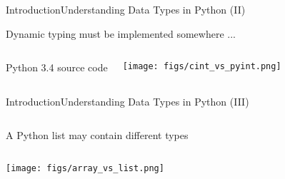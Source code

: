\documentclass[10pt,compress]{beamer} %
\begin{document}
\begin{frame}{Introduction}{Understanding Data Types in Python (II)}

	Dynamic typing must be implemented somewhere ...

    \begin{columns}
			\begin{block}{\footnotesize{Python 3.4 source code}}
			\vspace{-0.2cm} 
				
			\vspace{-0.2cm} 
			\end{block}

			\texttt{[image: figs/cint\_vs\_pyint.png]}	
	\end{columns}

\end{frame}

\begin{frame}[fragile]{Introduction}{Understanding Data Types in Python (III)}
	\begin{columns}
			A Python list may contain different types

	   \begin{exampleblock}{}
			\vspace{-0.2cm} 
			
			\vspace{-0.2cm} 
		\end{exampleblock}
	\end{columns}

	\bigskip

	\centering \texttt{[image: figs/array\_vs\_list.png]}	
\end{frame}
\end{document}
